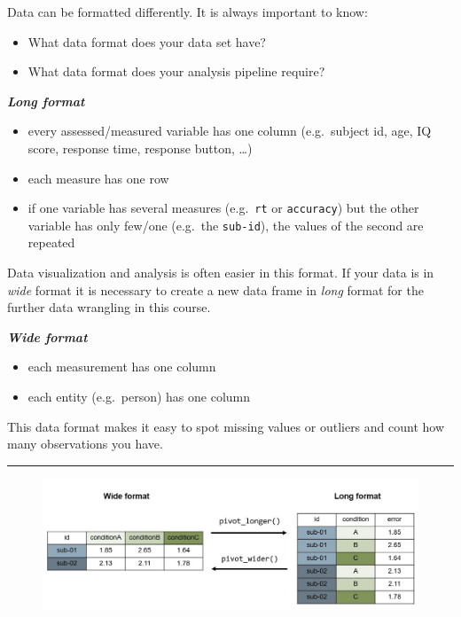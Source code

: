 \documentclass[
  letterpaper,
  DIV=11,
  numbers=noendperiod,
  oneside]{scrreprt}
\begin{document}
Data can be formatted differently. It is always important to know:

\begin{itemize}
\item
  What data format does your data set have?
\item
  What data format does your analysis pipeline require?
\end{itemize}

\textbf{\emph{Long format}}

\begin{itemize}
\item
  every assessed/measured variable has one column (e.g.~subject id, age,
  IQ score, response time, response button, \ldots)
\item
  each measure has one row
\item
  if one variable has several measures (e.g.~\texttt{rt} or
  \texttt{accuracy}) but the other variable has only few/one (e.g.~the
  \texttt{sub-id}), the values of the second are repeated
\end{itemize}

Data visualization and analysis is often easier in this format. If your
data is in \emph{wide} format it is necessary to create a new data frame
in \emph{long} format for the further data wrangling in this course.

\textbf{\emph{Wide format}}

\begin{itemize}
\item
  each measurement has one column
\item
  each entity (e.g.~person) has one column
\end{itemize}

This data format makes it easy to spot missing values or outliers and
count how many observations you have.

\begin{center}\rule{0.5\linewidth}{0.5pt}\end{center}

\begin{figure}

{\centering \includegraphics{imgs/widelongformat.JPG}

}

\end{figure}
\end{document}
